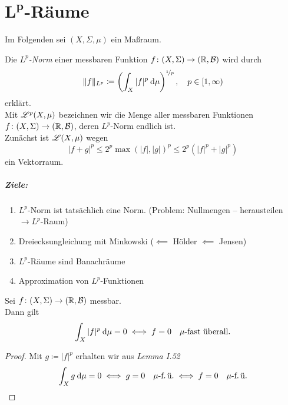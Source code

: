 \documentclass[skript.tex]{subfiles}
\begin{document}
	\chapter{$\boldsymbol{L^p}$-Räume}
	\setcounter{cntr}{0}
		
	\begin{notat*}
		Im Folgenden sei $(X,\Sigma,\mu)$ ein Maßraum.
	\end{notat*}

	\begin{defin}[$L^p$-„Norm“]
		Die \emph{$L^p$-Norm} einer messbaren Funktion $f \colon (X,\Sigma) \to (\mathbb{R},\mathcal{B})$ wird durch
		\[
			\lVert f \rVert_{L^p} \coloneqq \left(
				\int_X |f|^p \: \mathrm{d} \mu
			\right)^{\nicefrac{1}{p}}, \quad p \in [1,\infty)
		\]
		erklärt.
		\medskip\\
		Mit $\mathscr{L}^p(X,\mu)$ bezeichnen wir die Menge aller messbaren Funktionen $f \colon (X,\Sigma) \to (\mathbb{R},\mathcal{B})$, deren $L^p$-Norm endlich ist.\\
		Zunächst ist $\mathscr{L}(X,\mu)$ wegen
		\[
			|f+g|^p \leq 2^p \max(|f|,|g|)^p \leq 2^p(|f|^p+|g|^p)
		\]
		ein Vektorraum.
	\end{defin}
	\paragraph{Ziele:}
	\begin{enumerate}[(1)]
		\item $L^p$-Norm ist tatsächlich eine Norm. (Problem: Nullmengen -- herausteilen $\rightarrow L^p$-Raum)
		\item Dreiecksungleichung mit Minkowski ($\impliedby$ Hölder $\impliedby$ Jensen)
		\item $L^p$-Räume sind Banachräume
		\item Approximation von $L^p$-Funktionen
	\end{enumerate}

	\begin{lem}
		Sei $f \colon (X,\Sigma) \to (\mathbb{R},\mathcal{B})$ messbar.\\
		Dann gilt
		\[
			\int_X |f|^p \: \mathrm{d} \mu = 0 \iff f=0 \text{\quad$\mu$-fast überall.}
		\]
	\end{lem}
	\begin{proof}
		Mit $g \coloneqq |f|^p$ erhalten wir aus \emph{Lemma I.52}
		\[
			\int_X g \: \mathrm{d}\mu = 0 \iff g=0 \text{\quad$\mu$-f.\,ü.} \iff f=0 \text{\quad$\mu$-f.\,ü.}
		\]
	\end{proof}
\end{document}
